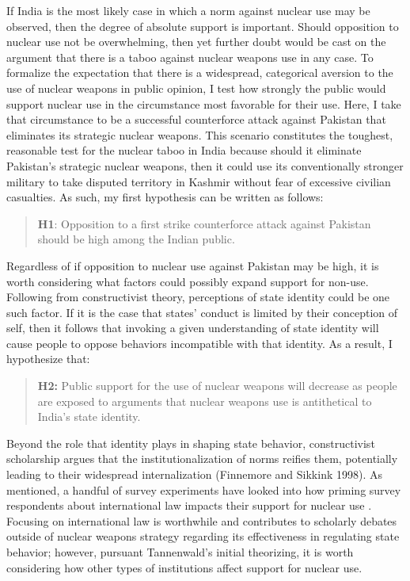 \documentclass[12pt]{article}
\begin{document}
If India is the most likely case in which a norm against nuclear use may be observed, then the degree of absolute support is important. Should opposition to nuclear use not be overwhelming, then yet further doubt would be cast on the argument that there is a taboo against nuclear weapons use in any case. To formalize the expectation that there is a widespread, categorical aversion to the use of nuclear weapons in public opinion, I test how strongly the public would support nuclear use in the circumstance most favorable for their use. Here, I take that circumstance to be a successful counterforce attack against Pakistan that eliminates its strategic nuclear weapons. This scenario constitutes the toughest, reasonable test for the nuclear taboo in India because should it eliminate Pakistan's strategic nuclear weapons, then it could use its conventionally stronger military to take disputed territory in Kashmir without fear of excessive civilian casualties. As such, my first hypothesis can be written as follows: 

\begin{quote}
\textbf{H1}: Opposition to a first strike counterforce attack against Pakistan should be high among the Indian public.
\end{quote}

Regardless of if opposition to nuclear use against Pakistan may be high, it is worth considering what factors could possibly expand support for non-use. Following from constructivist theory, perceptions of state identity could be one such factor. If it is the case that states' conduct is limited by their conception of self, then it follows that invoking a given understanding of state identity will cause people to oppose behaviors incompatible with that identity. As a result, I hypothesize that:

\begin{quote}
\textbf{H2:} Public support for the use of nuclear weapons will decrease as people are exposed to arguments that nuclear weapons use is antithetical to India's state identity.
\end{quote}

Beyond the role that identity plays in shaping state behavior, constructivist scholarship argues that the institutionalization of norms reifies them, potentially leading to their widespread internalization (Finnemore and Sikkink 1998). As mentioned, a handful of survey experiments have looked into how priming survey respondents about international law impacts their support for nuclear use \citep{carpenter_stopping_2020, sagan_does_2020, sagan_atomic_2024}.  Focusing on international law is worthwhile and contributes to scholarly debates outside of nuclear weapons strategy regarding its effectiveness in regulating state behavior; however, pursuant Tannenwald's initial theorizing, it is worth considering how other types of institutions affect support for nuclear use. 
\end{document}
